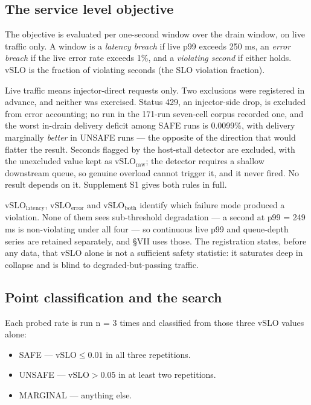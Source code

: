 \documentclass{ieeeaccess}
\begin{document}
\subsection{The service level objective}

The objective is evaluated per one-second window over the drain window, on live traffic only. A window is a \textit{latency breach} if live p99 exceeds 250 ms, an \textit{error breach} if the live error rate exceeds 1\%, and a \textit{violating second} if either holds. $\mathrm{vSLO}$ is the fraction of violating seconds (the SLO violation fraction).

Live traffic means injector-direct requests only. Two exclusions were registered in advance, and neither was exercised. Status 429, an injector-side drop, is excluded from error accounting; no run in the 171-run seven-cell corpus recorded one, and the worst in-drain delivery deficit among SAFE runs is 0.0099\%, with delivery marginally \textit{better} in UNSAFE runs --- the opposite of the direction that would flatter the result. Seconds flagged by the host-stall detector are excluded, with the unexcluded value kept as $\mathrm{vSLO}_{\mathrm{raw}}$; the detector requires a shallow downstream queue, so genuine overload cannot trigger it, and it never fired. No result depends on it. Supplement S1 gives both rules in full.

$\mathrm{vSLO}_{\mathrm{latency}}$, $\mathrm{vSLO}_{\mathrm{error}}$ and $\mathrm{vSLO}_{\mathrm{both}}$ identify which failure mode produced a violation. None of them sees sub-threshold degradation --- a second at p99 = 249 ms is non-violating under all four --- so continuous live p99 and queue-depth series are retained separately, and \S{}VII uses those. The registration states, before any data, that $\mathrm{vSLO}$ alone is not a sufficient safety statistic: it saturates deep in collapse and is blind to degraded-but-passing traffic.

\subsection{Point classification and the search}

Each probed rate is run n = 3 times and classified from those three $\mathrm{vSLO}$ values alone:

\begin{itemize}
\item SAFE --- $\mathrm{vSLO} \leq 0.01$ in all three repetitions.
\item UNSAFE --- $\mathrm{vSLO} > 0.05$ in at least two repetitions.
\item MARGINAL --- anything else.
\end{itemize}
\end{document}
